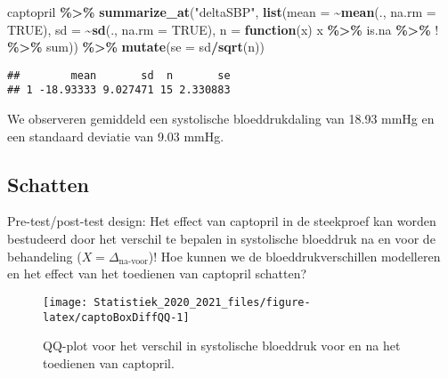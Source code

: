 \documentclass[
  12pt,dutch,coursenotes]{book}
\newenvironment{Shaded}{\begin{snugshade}}{\end{snugshade}}
\newcommand{\ControlFlowTok}[1]{\textcolor[rgb]{0.13,0.29,0.53}{\textbf{#1}}}
\newcommand{\DataTypeTok}[1]{\textcolor[rgb]{0.13,0.29,0.53}{#1}}
\newcommand{\KeywordTok}[1]{\textcolor[rgb]{0.13,0.29,0.53}{\textbf{#1}}}
\newcommand{\NormalTok}[1]{#1}
\newcommand{\OperatorTok}[1]{\textcolor[rgb]{0.81,0.36,0.00}{\textbf{#1}}}
\newcommand{\OtherTok}[1]{\textcolor[rgb]{0.56,0.35,0.01}{#1}}
\newcommand{\StringTok}[1]{\textcolor[rgb]{0.31,0.60,0.02}{#1}}
\theoremstyle{definition}
\theoremstyle{definition}
\theoremstyle{definition}
\theoremstyle{remark}
\begin{document}
\begin{Shaded}
\begin{Highlighting}[]
\NormalTok{captopril }\OperatorTok{\%\textgreater{}\%}\StringTok{ }\KeywordTok{summarize\_at}\NormalTok{(}\StringTok{"deltaSBP"}\NormalTok{, }\KeywordTok{list}\NormalTok{(}\DataTypeTok{mean =} \OperatorTok{\textasciitilde{}}\KeywordTok{mean}\NormalTok{(., }
    \DataTypeTok{na.rm =} \OtherTok{TRUE}\NormalTok{), }\DataTypeTok{sd =} \OperatorTok{\textasciitilde{}}\KeywordTok{sd}\NormalTok{(., }\DataTypeTok{na.rm =} \OtherTok{TRUE}\NormalTok{), }\DataTypeTok{n =} \ControlFlowTok{function}\NormalTok{(x) x }\OperatorTok{\%\textgreater{}\%}\StringTok{ }
\StringTok{    }\NormalTok{is.na }\OperatorTok{\%\textgreater{}\%}\StringTok{ \textasciigrave{}}\DataTypeTok{!}\StringTok{\textasciigrave{}} \OperatorTok{\%\textgreater{}\%}\StringTok{ }\NormalTok{sum)) }\OperatorTok{\%\textgreater{}\%}\StringTok{ }\KeywordTok{mutate}\NormalTok{(}\DataTypeTok{se =}\NormalTok{ sd}\OperatorTok{/}\KeywordTok{sqrt}\NormalTok{(n))}
\end{Highlighting}
\end{Shaded}

\begin{verbatim}
##        mean       sd  n       se
## 1 -18.93333 9.027471 15 2.330883
\end{verbatim}

We observeren gemiddeld een systolische bloeddrukdaling van 18.93 mmHg en een standaard deviatie van 9.03 mmHg.

\hypertarget{schatten}{%
\subsection{Schatten}\label{schatten}}

Pre-test/post-test design: Het effect van captopril in de steekproef kan worden bestudeerd door het verschil te bepalen in systolische bloeddruk na en voor de behandeling (\(X=\Delta_\text{na-voor}\))!
Hoe kunnen we de bloeddrukverschillen modelleren en het effect van het toedienen van captopril schatten?

\begin{figure}

{\centering \texttt{[image: Statistiek\_2020\_2021\_files/figure-latex/captoBoxDiffQQ-1]} 

}

\caption{QQ-plot voor het verschil in systolische bloeddruk voor en na het toedienen van captopril.}\label{fig:captoBoxDiffQQ}
\end{figure}
\end{document}
